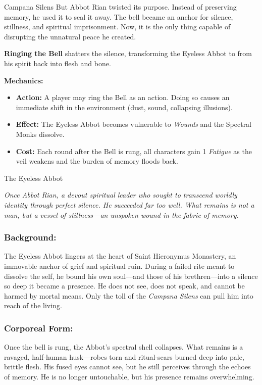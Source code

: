 \begin{multicols}{2}
\begin{CommentBox}{Campana Silens}
    But Abbot Rian twisted its purpose. Instead of preserving memory, he used it to seal it away. The bell became an anchor for silence, stillness, and spiritual imprisonment. Now, it is the only thing capable of disrupting the unnatural peace he created.
    
    \vspace{0.5\baselineskip}\noindent
    \textbf{Ringing the Bell} shatters the silence, transforming the Eyeless Abbot to from his spirit back into flesh and bone.
    
    \vspace{0.5\baselineskip}
    \textbf{Mechanics:}
    \begin{itemize}
        \item \textbf{Action:} A player may ring the Bell as an action. Doing so causes an immediate shift in the environment (dust, sound, collapsing illusions).
        \item \textbf{Effect:} The Eyeless Abbot becomes vulnerable to \emph{Wounds} and the Spectral Monks dissolve.
        \item \textbf{Cost:} Each round after the Bell is rung, all characters gain 1 \emph{Fatigue} as the veil weakens and the burden of memory floods back.
    \end{itemize}
\end{CommentBox}

\newcolumn

\begin{NPC}[description=Silence Incarnate]{The Eyeless Abbot}

    \emph{Once Abbot Rian, a devout spiritual leader who sought to transcend worldly identity through perfect silence. He succeeded far too well. What remains is not a man, but a vessel of stillness—an unspoken wound in the fabric of memory.}

    \subsubsection*{Background:}
    The Eyeless Abbot lingers at the heart of Saint Hieronymus Monastery, an immovable anchor of grief and spiritual ruin. During a failed rite meant to dissolve the self, he bound his own soul—and those of his brethren—into a silence so deep it became a presence. He does not see, does not speak, and cannot be harmed by mortal means. Only the toll of the \emph{Campana Silens} can pull him into reach of the living.

    \subsubsection*{Corporeal Form:}
    Once the bell is rung, the Abbot’s spectral shell collapses. What remains is a ravaged, half-human husk—robes torn and ritual-scars burned deep into pale, brittle flesh. His fused eyes cannot see, but he still perceives through the echoes of memory. He is no longer untouchable, but his presence remains overwhelming.


\end{NPC}
\end{multicols}
